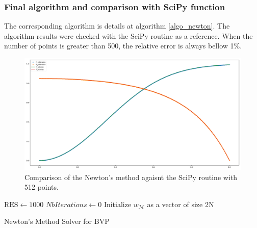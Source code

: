 \documentclass[11pt,a4paper,twocolumn]{article}
\begin{document}
\subsubsection{Final algorithm and comparison with SciPy function}
The corresponding algorithm is details at algorithm \ref{algo_newton}. The algorithm results were checked with the SciPy routine as a reference. When the number of points is greater than 500, the relative error is always bellow 1\%.
\begin{figure}[hbtp]
\caption{Comparison of the Newton's method agaisnt the SciPy routine with 512 points.}
\centering
\includegraphics[scale=0.18]{../pictures/NewtonVsScipy.png}
\end{figure}


\IncMargin{1em}
\begin{algorithm}[h]
	\BlankLine
	$\text{RES} \leftarrow  1000$ \;
	$NbIterations \leftarrow 0$\;
	Initialize $w_{\mathcal{M}}$ as a vector of size 2N\;
	\BlankLine
	
	
\caption{Newton's Method Solver for BVP}\label{algo_newton}
\end{algorithm}
\DecMargin{1em}
\end{document}
